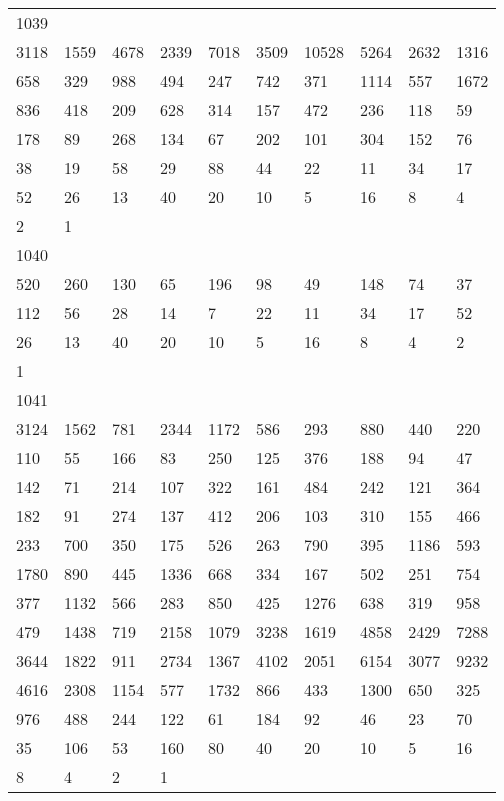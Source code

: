 \begin{longtable}{*{10}{l}}
1039&&&&&&&&&\\
3118& 1559& 4678& 2339& 7018& 3509& 10528& 5264& 2632& 1316\\
658& 329& 988& 494& 247& 742& 371& 1114& 557& 1672\\
836& 418& 209& 628& 314& 157& 472& 236& 118& 59\\
178& 89& 268& 134& 67& 202& 101& 304& 152& 76\\
38& 19& 58& 29& 88& 44& 22& 11& 34& 17\\
52& 26& 13& 40& 20& 10& 5& 16& 8& 4\\
2& 1& \\

1040&&&&&&&&&\\
520& 260& 130& 65& 196& 98& 49& 148& 74& 37\\
112& 56& 28& 14& 7& 22& 11& 34& 17& 52\\
26& 13& 40& 20& 10& 5& 16& 8& 4& 2\\
1& \\

1041&&&&&&&&&\\
3124& 1562& 781& 2344& 1172& 586& 293& 880& 440& 220\\
110& 55& 166& 83& 250& 125& 376& 188& 94& 47\\
142& 71& 214& 107& 322& 161& 484& 242& 121& 364\\
182& 91& 274& 137& 412& 206& 103& 310& 155& 466\\
233& 700& 350& 175& 526& 263& 790& 395& 1186& 593\\
1780& 890& 445& 1336& 668& 334& 167& 502& 251& 754\\
377& 1132& 566& 283& 850& 425& 1276& 638& 319& 958\\
479& 1438& 719& 2158& 1079& 3238& 1619& 4858& 2429& 7288\\
3644& 1822& 911& 2734& 1367& 4102& 2051& 6154& 3077& 9232\\
4616& 2308& 1154& 577& 1732& 866& 433& 1300& 650& 325\\
976& 488& 244& 122& 61& 184& 92& 46& 23& 70\\
35& 106& 53& 160& 80& 40& 20& 10& 5& 16\\
8& 4& 2& 1& \\


\end{longtable}
